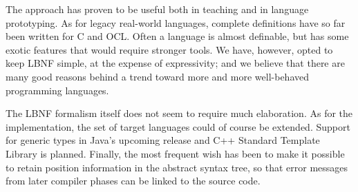 \documentclass{llncs}
\begin{document}
The approach has proven to be useful both in teaching and
in language prototyping. As for legacy real-world languages, 
complete definitions have so far been written for C and OCL.
Often a language is almost definable, but has some
exotic features that would require stronger tools.
We have, however, opted to keep LBNF simple, at the expense
of expressivity; and we believe that there are many good reasons
behind a trend toward
more and more well-behaved programming languages.

The LBNF formalism itself does not seem to require much
elaboration. As for the implementation, 
the set of target languages could of course be extended.
Support for generic 
types in Java's upcoming release and C++ Standard Template 
Library is planned. 
Finally, the most frequent wish has been
to make it possible to retain position information
in the abstract syntax tree, so that error messages from later
compiler phases can be linked to the source code.






% 
\end{document}
